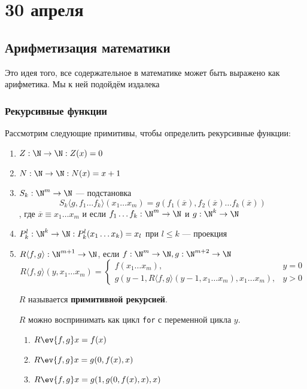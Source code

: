 \chapter{30 апреля}

\section{Арифметизация математики}

Это идея того, все содержательное в математике может быть выражено как арифметика. Мы к ней подойдём издалека

\subsection{Рекурсивные функции}

Рассмотрим следующие примитивы, чтобы определить рекурсивные функции:
\begin{enumerate}
    \item \(Z : \N \to \N : Z(x) = 0\)
    \item \(N : \N \to \N : N(x) = x + 1\)
    \item \(S_k : \N^m \to \N\) --- подстановка
          \[S_k \langle g, f_1 \dots f_k \rangle(x_1 \dots x_m) = g(f_1(\overline{x}), f_2(\overline{x}) \dots f_k(\overline x))\], где \(\overline x \equiv x_1 \dots x_m\) и если \(f_1 \dots f_k : \N^m \to \N\) и \(g : \N^k \to \N\)
    \item \(P_k^l : \N^k \to \N : P_k^l(x_1 \dots x_k) = x_l\) при \(l \leq k\) --- проекция
    \item \(R\langle f, g \rangle : \N^{m + 1} \to \N\), если \(f : \N^m \to \N, g : \N^{m + 2} \to \N\)
          \[R \langle f, g \rangle (y, x_1 \dots x_m) = \begin{cases}
                  f(x_1 \dots x_m),                                                      & y = 0 \\
                  g(y - 1, R \langle f, g \rangle(y - 1, x_1 \dots x_m), x_1 \dots x_m), & y > 0
              \end{cases} \]

          \(R\) называется \textbf{примитивной рекурсией}.

          \(R\) можно воспринимать как цикл \texttt{for} с переменной цикла \(y\).

          \begin{example}\itemfix
              \begin{enumerate}
                  \item \(R\ev{f,g} x = f(x)\)
                  \item \(R\ev{f,g} x = g(0, f(x), x)\)
                  \item \(R\ev{f,g} x = g(1, g(0, f(x), x), x)\)
              \end{enumerate}
          \end{example}
\end{enumerate}

